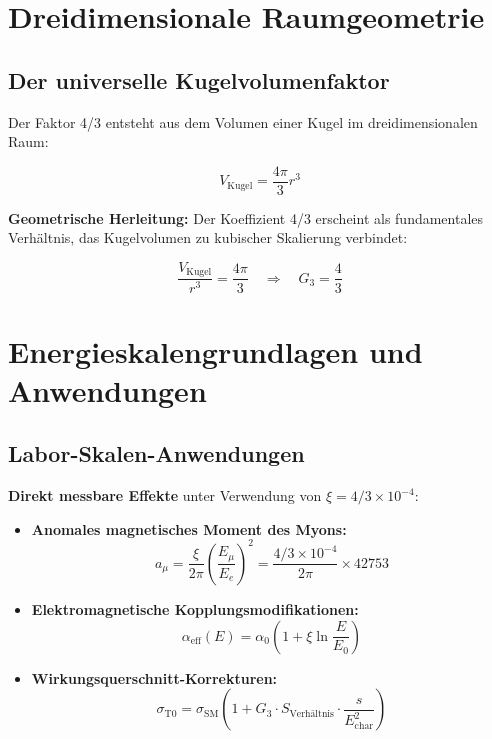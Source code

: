 \documentclass[12pt,a4paper]{report}
\begin{document}
	\section{Dreidimensionale Raumgeometrie}
	\label{sec:3d_space_geometry}
	
	\subsection{Der universelle Kugelvolumenfaktor}
	\label{subsec:sphere_volume_factor}
	
	Der Faktor 4/3 entsteht aus dem Volumen einer Kugel im dreidimensionalen Raum:
	
	\begin{equation}
		V_{\text{Kugel}} = \frac{4\pi}{3} r^3
	\end{equation}
	
	\textbf{Geometrische Herleitung:}
	Der Koeffizient 4/3 erscheint als fundamentales Verhältnis, das Kugelvolumen zu kubischer Skalierung verbindet:
	
	\begin{equation}
		\frac{V_{\text{Kugel}}}{r^3} = \frac{4\pi}{3} \quad \Rightarrow \quad G_3 = \frac{4}{3}
	\end{equation}
	
	\section{Energieskalengrundlagen und Anwendungen}
	\label{sec:energy_foundations}
	
	\subsection{Labor-Skalen-Anwendungen}
	\label{subsec:laboratory_applications}
	
	\textbf{Direkt messbare Effekte} unter Verwendung von $\xi = 4/3 \times 10^{-4}$:
	
	\begin{itemize}
		\item \textbf{Anomales magnetisches Moment des Myons:}
		\begin{equation}
			a_\mu = \frac{\xi}{2\pi} \left(\frac{E_\mu}{E_e}\right)^2 = \frac{4/3 \times 10^{-4}}{2\pi} \times 42753
		\end{equation}
		
		\item \textbf{Elektromagnetische Kopplungsmodifikationen:}
		\begin{equation}
			\alpha_{\text{eff}}(E) = \alpha_0 \left(1 + \xi \ln\frac{E}{E_0}\right)
		\end{equation}
		
		\item \textbf{Wirkungsquerschnitt-Korrekturen:}
		\begin{equation}
			\sigma_{\text{T0}} = \sigma_{\text{SM}} \left(1 + G_3 \cdot S_{\text{Verhältnis}} \cdot \frac{s}{E_{\text{char}}^2}\right)
		\end{equation}
	\end{itemize}
	
\end{document}
